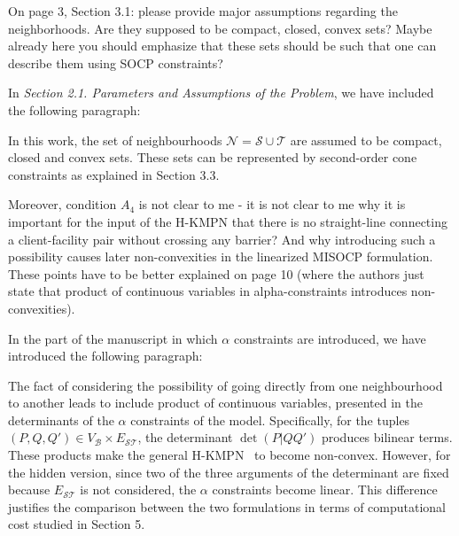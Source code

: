 \documentclass{article}
\newenvironment{reviewer}{\setcounter{pointcounter}{1}}{}
\newcommand{\point}{\text{{\selectfont \thepointcounter} \stepcounter{pointcounter}}}
\begin{document}
\begin{reviewer}
		\begin{itshape}
			On page 3, Section 3.1: please provide major assumptions regarding the neighborhoods. Are they supposed to be compact, closed, convex sets? Maybe already here you should emphasize that these sets should be such that one can describe them using SOCP constraints?
		\end{itshape}
		
		\begin{tcolorbox}[breakable,enhanced,coltitle=black,colback=green!5!white,colframe=green!75!black,title=\textbf{Answer R2.\point},borderline={1pt}{0pt}{black},boxrule=0pt]
			In \textit{Section 2.1. Parameters and Assumptions of the Problem}, we have included the following paragraph: 

			\medskip
			
			In this work, the set of neighbourhoods $\mathcal N=\mathcal S\cup\mathcal T$ are assumed to be compact, closed and convex sets. These sets can be represented by second-order cone constraints as explained in Section 3.3. 
		\end{tcolorbox}
		
		\begin{itshape}
			Moreover, condition $A_4$ is not clear to me - it is not clear to me why it is important for the input of the H-KMPN that there is no straight-line connecting a client-facility pair without crossing any barrier? And why introducing such a possibility causes later non-convexities in the linearized MISOCP formulation. These points have to be better explained on page 10 (where the authors just state that product of continuous variables in alpha-constraints introduces non-convexities).		
		\end{itshape}
	
		\begin{tcolorbox}[breakable,enhanced,coltitle=black,colback=green!5!white,colframe=green!75!black,title=\textbf{Answer R2.\point},borderline={1pt}{0pt}{black},boxrule=0pt]
			In the part of the manuscript in which $\alpha$ constraints are introduced, we have introduced the following paragraph:
			\medskip
			
			{\color{red}The fact of considering the possibility of going directly from one neighbourhood  to another leads to include product of continuous variables, presented in the determinants of the $\alpha$ constraints of the model. Specifically, for the tuples $(P, Q, Q')\in V_\mathcal B\times E_{\mathcal S\mathcal T}$, the determinant $\det(P|QQ')$ produces bilinear terms. These products make the general H-KMPN \ to become non-convex. However, for the hidden version, since two of the three arguments of the determinant are fixed because $E_{\mathcal S\mathcal T}$ is not considered, the $\alpha$ constraints become linear. This difference justifies the comparison between the two formulations in terms of computational cost studied in Section 5.}
		\end{tcolorbox}
	

\end{reviewer}
\end{document}

